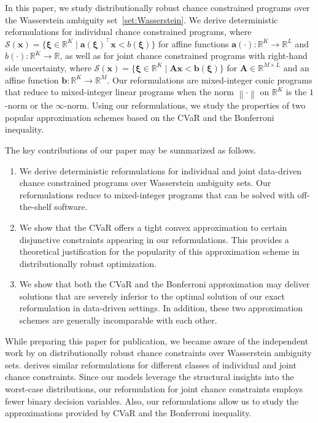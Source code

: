 \documentclass[nonblindrev]{informs2017}
\newcommand{\1}[1]{\mathds{1}{\left(#1\right)}}
\begin{document}
In this paper, we study distributionally robust chance constrained programs over the Wasserstein ambiguity set~\eqref{set:Wasserstein}. We derive deterministic reformulations for individual chance constrained programs, where $\mathcal{S}(\bm{x}) = \{ \bm{\xi} \in \mathbb{R}^K \mid \bm{a} (\bm{\xi})^\top \bm{x} < b (\bm{\xi}) \}$ for affine functions $\bm{a}(\cdot) : \mathbb{R}^K \rightarrow \mathbb{R}^L$ and $b(\cdot) : \mathbb{R}^K \rightarrow \mathbb{R}$, as well as for joint chance constrained programs with right-hand side uncertainty, where $\mathcal{S}(\bm{x}) = \{\bm{\xi} \in \mathbb{R}^K \mid \bm{A} \bm{x} < \bm{b} (\bm{\xi}) \}$ for $\bm{A} \in \mathbb{R}^{M \times L}$ and an affine function $\bm{b} : \mathbb{R}^K \rightarrow \mathbb{R}^M$. Our reformulations are mixed-integer conic programs that reduce to mixed-integer linear programs when the norm $\left \lVert \cdot \right \rVert$ on $\mathbb{R}^K$ is the $1$-norm or the $\infty$-norm. Using our reformulations, we study the properties of two popular approximation schemes based on the CVaR and the Bonferroni inequality.

The key contributions of our paper may be summarized as follows.
\begin{enumerate}[leftmargin=*, labelindent=16pt]
\item We derive deterministic reformulations for individual and joint data-driven chance constrained programs over Wasserstein ambiguity sets. Our reformulations reduce to mixed-integer programs that can be solved with off-the-shelf software.
\item We show that the CVaR offers a tight convex approximation to certain disjunctive constraints appearing in our reformulations. This provides a theoretical justification for the popularity of this approximation scheme in distributionally robust optimization.
\item We show that both the CVaR and the Bonferroni approximation may deliver solutions that are severely inferior to the optimal solution of our exact reformulation in data-driven settings. In addition, these two approximation schemes are generally incomparable with each other.
\end{enumerate}

While preparing this paper for publication, we became aware of the independent work by \cite{Xie_2018} on distributionally robust chance constraints over Wasserstein ambiguity sets. \cite{Xie_2018} derives similar reformulations for different classes of individual and joint chance constraints. Since our models leverage the structural insights into the worst-case distributions, our reformulation for joint chance constraints employs fewer binary decision variables. Also, our reformulations allow us to study the approximations provided by CVaR and the Bonferroni inequality.
\end{document}
